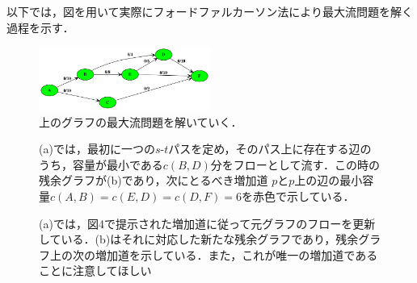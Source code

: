 \documentclass[
]{ltjarticle}
\begin{document}
以下では，図を用いて実際にフォードファルカーソン法により最大流問題を解く過程を示す．

\begin{figure}
\centering
\includegraphics[width=0.5\textwidth]{0.png}
\caption{上のグラフの最大流問題を解いていく．}
\end{figure}

\begin{figure}%
    \centering
    \qquad
    \caption{(a)では，最初に一つの$s$-$t$パスを定め，そのパス上に存在する辺のうち，容量が最小である$c(B, D)$分をフローとして流す．この時の残余グラフが(b)であり，次にとるべき増加道 $p$と$p$上の辺の最小容量$c(A, B) = c(E,D) = c(D, F) = 6$を赤色で示している．}
    \label{fig:example}%
\end{figure}

\begin{figure}%
    \centering
    \qquad
    \caption{(a)では，図4で提示された増加道に従って元グラフのフローを更新している．(b)はそれに対応した新たな残余グラフであり，残余グラフ上の次の増加道を示している．また，これが唯一の増加道であることに注意してほしい}
\end{figure}
\end{document}
